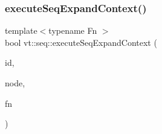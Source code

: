 \subsubsection{\texorpdfstring{execute\+Seq\+Expand\+Context()}{executeSeqExpandContext()}}
{\footnotesize\ttfamily template$<$typename Fn $>$ \\
bool vt\+::seq\+::execute\+Seq\+Expand\+Context (\begin{DoxyParamCaption}\item[{\hyperlink{namespacevt_1_1seq_a3b612da217ac669d39c159f134ab8434}{Seq\+Type} const \&}]{id,  }\item[{\hyperlink{namespacevt_1_1seq_ae6a4874b585be0612aaca32ca6d2d191}{Seq\+Node\+Ptr\+Type}}]{node,  }\item[{Fn \&\&}]{fn }\end{DoxyParamCaption})}

